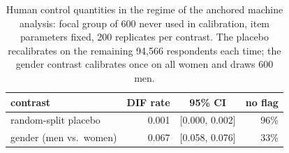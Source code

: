 \begin{table}[t]
\caption{Human control quantities in the regime of the anchored machine analysis: focal group of 600 never used in calibration, item parameters fixed, 200 replicates per contrast. The placebo recalibrates on the remaining 94{,}566 respondents each time; the gender contrast calibrates once on all women and draws 600 men.}
\label{tab:controls}\centering
\begin{tabular}{lrcr}\toprule
contrast & DIF rate & 95\% CI & no flag \\\midrule
random-split placebo & 0.001 & [0.000, 0.002] & 96\% \\
gender (men vs.\ women) & 0.067 & [0.058, 0.076] & 33\% \\
\bottomrule\end{tabular}\end{table}
